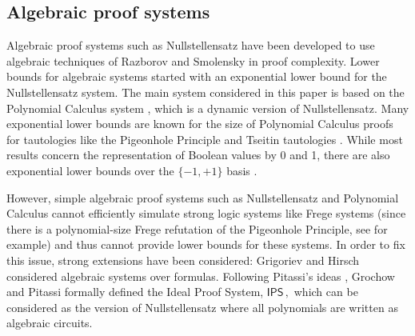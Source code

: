 \documentclass{toc}
\begin{document}
\subsection{Algebraic proof systems} %
Algebraic proof systems such as Nullstellensatz %
have been  %
developed to use
%
algebraic techniques of Razborov and Smolensky \cite{Razborov87-eng, Smolensky87}
%
in proof complexity.  %
Lower bounds for algebraic systems started with an exponential lower bound for the Nullstellensatz \cite{BeameIKPP96} system. The main system considered in this paper is based on the Polynomial Calculus system \cite{CEI96}, which is a dynamic version of Nullstellensatz. Many exponential lower bounds are known for the size of Polynomial Calculus proofs for tautologies like the Pigeonhole Principle \cite{MR1691494,IPS99} and Tseitin tautologies \cite{BussGIP01}. While most results concern the representation of Boolean values by 0 and 1, there are also exponential lower bounds over the $\{-1, +1\}$ basis \cite{Sok20}. 

However, simple algebraic proof systems such as Nullstellensatz and Polynomial Calculus cannot
efficiently %
%
%
simulate strong logic systems like Frege systems (since there is a %
%
polynomial-size
%
Frege refutation of the Pigeonhole Principle, see \cite{CR79} for example) and thus cannot %
provide lower bounds for these systems. In order to fix this issue, strong extensions
%
have been %
considered: Grigoriev and Hirsch \cite{GH03} considered algebraic systems over formulas.
%
%
%
%
%
Following Pitassi's ideas \cite{Pit97, Pit98}, Grochow and Pitassi \cite{GP14} formally
defined the Ideal Proof System, %
$\mathsf{IPS}\,,$ %
%
which can be considered as the version of Nullstellensatz where all polynomials are written as  algebraic
circuits. %
\end{document}
